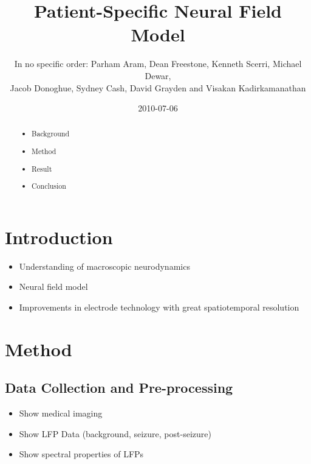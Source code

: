 \documentclass[]{article}
\title{Patient-Specific Neural Field Model}
\author{In no specific order: Parham Aram, Dean Freestone, Kenneth Scerri, Michael Dewar,\\
 Jacob Donoghue, Sydney Cash, David Grayden and Visakan Kadirkamanathan  }
\date{2010-07-06}
\begin{document}
\ifpdf
{}
\else
{}
\fi

\maketitle


\begin{abstract}
	
	\begin{itemize}
		\item Background
		\item Method
		\item Result
		\item Conclusion
	\end{itemize}
\end{abstract}

\section{Introduction}
\begin{itemize}
	\item Understanding of macroscopic neurodynamics
	\item Neural field model
	\item Improvements in electrode technology with great spatiotemporal resolution
\end{itemize}

\section{Method}

\subsection{Data Collection and Pre-processing}
\begin{itemize}
	\item Show medical imaging
	\item Show LFP Data (background, seizure, post-seizure)
	\item Show spectral properties of LFPs
\end{itemize}
\end{document}
